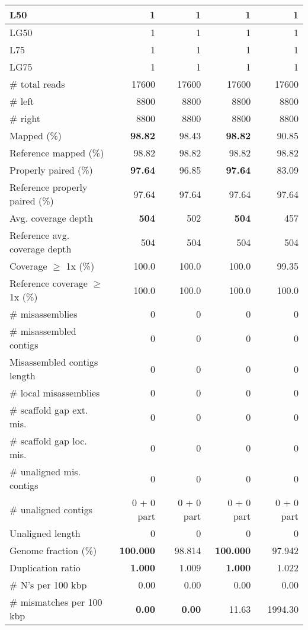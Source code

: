 \documentclass[12pt,a4paper]{article}
\begin{document}
\begin{table}[ht]
\begin{center}
\begin{tabular}{|l*{4}{|r}|}
L50 & 1 & 1 & 1 & 1 \\ \hline
LG50 & 1 & 1 & 1 & 1 \\ \hline
L75 & 1 & 1 & 1 & 1 \\ \hline
LG75 & 1 & 1 & 1 & 1 \\ \hline
\# total reads & 17600 & 17600 & 17600 & 17600 \\ \hline
\# left & 8800 & 8800 & 8800 & 8800 \\ \hline
\# right & 8800 & 8800 & 8800 & 8800 \\ \hline
Mapped (\%) & {\bf 98.82} & 98.43 & {\bf 98.82} & 90.85 \\ \hline
Reference mapped (\%) & 98.82 & 98.82 & 98.82 & 98.82 \\ \hline
Properly paired (\%) & {\bf 97.64} & 96.85 & {\bf 97.64} & 83.09 \\ \hline
Reference properly paired (\%) & 97.64 & 97.64 & 97.64 & 97.64 \\ \hline
Avg. coverage depth & {\bf 504} & 502 & {\bf 504} & 457 \\ \hline
Reference avg. coverage depth & 504 & 504 & 504 & 504 \\ \hline
Coverage $\geq$ 1x (\%) & 100.0 & 100.0 & 100.0 & 99.35 \\ \hline
Reference coverage $\geq$ 1x (\%) & 100.0 & 100.0 & 100.0 & 100.0 \\ \hline
\# misassemblies & 0 & 0 & 0 & 0 \\ \hline
\# misassembled contigs & 0 & 0 & 0 & 0 \\ \hline
Misassembled contigs length & 0 & 0 & 0 & 0 \\ \hline
\# local misassemblies & 0 & 0 & 0 & 0 \\ \hline
\# scaffold gap ext. mis. & 0 & 0 & 0 & 0 \\ \hline
\# scaffold gap loc. mis. & 0 & 0 & 0 & 0 \\ \hline
\# unaligned mis. contigs & 0 & 0 & 0 & 0 \\ \hline
\# unaligned contigs & 0 + 0 part & 0 + 0 part & 0 + 0 part & 0 + 0 part \\ \hline
Unaligned length & 0 & 0 & 0 & 0 \\ \hline
Genome fraction (\%) & {\bf 100.000} & 98.814 & {\bf 100.000} & 97.942 \\ \hline
Duplication ratio & {\bf 1.000} & 1.009 & {\bf 1.000} & 1.022 \\ \hline
\# N's per 100 kbp & 0.00 & 0.00 & 0.00 & 0.00 \\ \hline
\# mismatches per 100 kbp & {\bf 0.00} & {\bf 0.00} & 11.63 & 1994.30 \\ \hline

\end{tabular}
\end{center}
\end{table}
\end{document}
